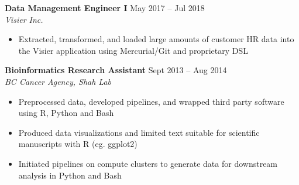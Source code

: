 \documentclass{res}
\renewcommand{\section}[1]{%
  \vspace{0.3in}%
  \centerline{\uppercase{\bf{#1}}}%
  \vspace{-6pt}}
\newcommand{\linehead}[2]{%
  {\bf #1} \hfill #2\\}
\newcommand{\linetitle}[1]{%
  {\sl #1}}
\newcommand{\linevolunteer}[3]{%
  {\sl #3}, {\bf #2} \hfill #1}%
\begin{document}
\begin{resume}
{\bf Data Management Engineer I} \hfill May 2017 -- Jul 2018\\
{\it Visier Inc.}
\begin{itemize}
  \item Extracted, transformed, and loaded large amounts of customer HR data into the Visier application using Mercurial/Git and proprietary DSL
\end{itemize}

{\bf Bioinformatics Research Assistant} \hfill Sept 2013 -- Aug 2014\\
{\it BC Cancer Agency, Shah Lab}
\begin{itemize}
  \item Preprocessed data, developed pipelines, and wrapped third party software using R, Python and Bash
  \item Produced data visualizations and limited text suitable for scientific manuscripts with R (eg. ggplot2)
  \item Initiated pipelines on compute clusters to generate data for downstream analysis in Python and Bash
\end{itemize}

%



\end{resume}
\end{document}
